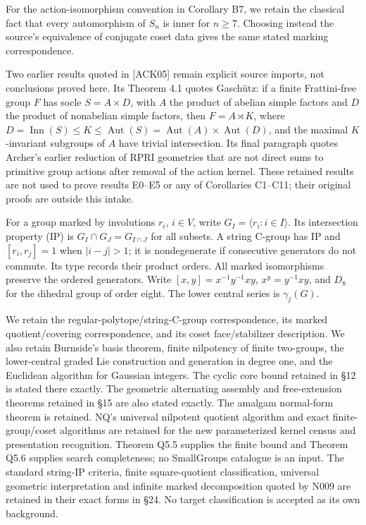\documentclass[
  10pt,
  letterpaper,
]{article}
\begin{document}
For the action-isomorphism convention in Corollary B7, we retain the
classical fact that every automorphism of \(S_n\) is inner for
\(n\geq7\). Choosing instead the source's equivalence of conjugate coset
data gives the same stated marking correspondence.

Two earlier results quoted in {[}ACK05{]} remain explicit source
imports, not conclusions proved here. Its Theorem 4.1 quotes Gaschütz:
if a finite Frattini-free group \(F\) has socle \(S=A\times D\), with
\(A\) the product of abelian simple factors and \(D\) the product of
nonabelian simple factors, then \(F=A\rtimes K\), where
\(D=\operatorname{Inn}(S)\leq K\leq\operatorname{Aut}(S)=\operatorname{Aut}(A)\times\operatorname{Aut}(D)\),
and the maximal \(K\)-invariant subgroups of \(A\) have trivial
intersection. Its final paragraph quotes Archer's earlier reduction of
RPRI geometries that are not direct sums to primitive group actions
after removal of the action kernel. These retained results are not used
to prove results E0--E5 or any of Corollaries C1--C11; their original
proofs are outside this intake.

For a group marked by involutions \(r_i\), \(i\in V\), write
\(G_I=\langle r_i:i\in I\rangle\). Its intersection property (IP) is
\(G_I\cap G_J=G_{I\cap J}\) for all subsets. A string C-group has IP and
\([r_i,r_j]=1\) when \(|i-j|>1\); it is nondegenerate if consecutive
generators do not commute. Its type records their product orders. All
marked isomorphisms preserve the ordered generators. Write
\([x,y]=x^{-1}y^{-1}xy\), \(x^y=y^{-1}xy\), and \(D_8\) for the dihedral
group of order eight. The lower central series is \(\gamma_j(G)\).

We retain the regular-polytope/string-C-group correspondence, its marked
quotient/covering correspondence, and its coset face/stabilizer
description. We also retain Burnside's basis theorem, finite nilpotency
of finite two-groups, the lower-central graded Lie construction and
generation in degree one, and the Euclidean algorithm for Gaussian
integers. The cyclic core bound retained in §12 is stated there exactly.
The geometric alternating assembly and free-extension theorems retained
in §15 are also stated exactly. The amalgam normal-form theorem is
retained. NQ's universal nilpotent quotient algorithm and exact
finite-group/coset algorithms are retained for the new parameterized
kernel census and presentation recognition. Theorem Q5.5 supplies the
finite bound and Theorem Q5.6 supplies search completeness; no
SmallGroups catalogue is an input. The standard string-IP criteria,
finite square-quotient classification, universal geometric
interpretation and infinite marked decomposition quoted by N009 are
retained in their exact forms in §24. No target classification is
accepted as its own background.
\end{document}
